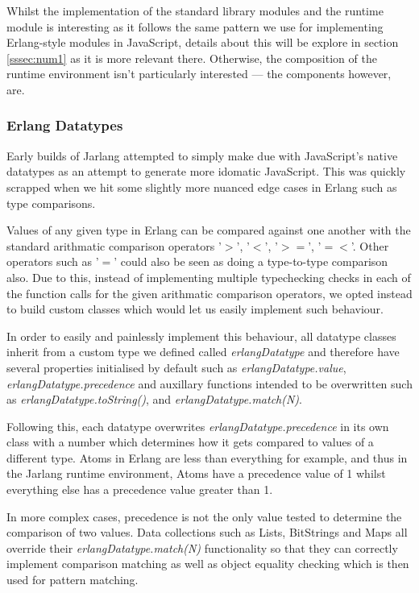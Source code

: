 \documentclass[twoside,12pt,titlepage,a4paper]{article}
\begin{document}
Whilst the implementation of the standard library modules and the runtime module is interesting as it follows the same pattern we use for implementing Erlang-style modules in JavaScript, details about this will be explore in section \ref{sssec:num1} as it is more relevant there. Otherwise, the composition of the runtime environment isn't particularly interested --- the components however, are.

\subsubsection{Erlang Datatypes}
Early builds of Jarlang attempted to simply make due with JavaScript's native datatypes as an attempt to generate more idomatic JavaScript. This was quickly scrapped when we hit some slightly more nuanced edge cases in Erlang such as type comparisons.

Values of any given type in Erlang can be compared against one another with the standard arithmatic comparison operators '$>$', '$<$', '$>=$', '$=<$'. Other operators such as '$=$' could also be seen as doing a type-to-type comparison also. Due to this, instead of implementing multiple typechecking checks in each of the function calls for the given arithmatic comparison operators, we opted instead to build custom classes which would let us easily implement such behaviour.

In order to easily and painlessly implement this behaviour, all datatype classes inherit from a custom type we defined called \textit{erlangDatatype} and therefore have several properties initialised by default such as \textit{erlangDatatype.value}, \textit{erlangDatatype.precedence} and auxillary functions intended to be overwritten such as \textit{erlangDatatype.toString()}, and \textit{erlangDatatype.match(N)}.

Following this, each datatype overwrites \textit{erlangDatatype.precedence} in its own class with a number which determines how it gets compared to values of a different type. Atoms in Erlang are less than everything for example, and thus in the Jarlang runtime environment, Atoms have a precedence value of 1 whilst everything else has a precedence value greater than 1.

In more complex cases, precedence is not the only value tested to determine the comparison of two values. Data collections such as Lists, BitStrings and Maps all override their \textit{erlangDatatype.match(N)} functionality so that they can correctly implement comparison matching as well as object equality checking which is then used for pattern matching.
\end{document}
